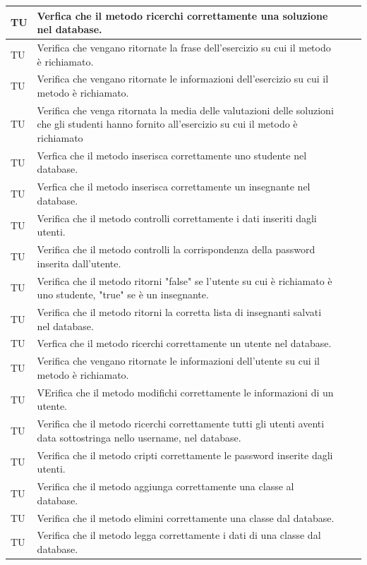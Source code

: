 \begin{longtable}{|>{\centering\arraybackslash}m{1.6cm}|>{\centering\arraybackslash}m{6.41cm}|>{\centering\arraybackslash}m{3.1cm}| c |}
		TU & Verfica che il metodo ricerchi correttamente una soluzione nel database.  \\ \hline
		TU & Verifica che vengano ritornate la frase dell'esercizio su cui il metodo è richiamato.  \\ \hline
		TU & Verifica che vengano ritornate le informazioni dell'esercizio su cui il metodo è richiamato.  \\ \hline
		TU & Verifica che venga ritornata la media delle valutazioni delle soluzioni che gli studenti hanno fornito all'esercizio su cui il metodo è richiamato  \\ \hline
		TU & Verfica che il metodo inserisca correttamente uno studente nel database.  \\ \hline
		TU & Verfica che il metodo inserisca correttamente un insegnante nel database.  \\ \hline
		TU & Verifica che il metodo controlli correttamente i dati inseriti dagli utenti.  \\ \hline
		TU & Verifica che il metodo controlli la corrispondenza della password inserita dall'utente.  \\ \hline
		TU & Verifica che il metodo ritorni "false" se l'utente su cui è richiamato è uno studente, "true" se è un insegnante.  \\ \hline
		TU & Verifica che il metodo ritorni la corretta lista di insegnanti salvati nel database.  \\ \hline
		TU & Verfica che il metodo ricerchi correttamente un utente nel database.  \\ \hline
		TU & Verifica che vengano ritornate le informazioni dell'utente su cui il metodo è richiamato.   \\ \hline
		TU & VErifica che il metodo modifichi correttamente le informazioni di un utente.  \\ \hline
		TU & Verifica che il metodo ricerchi correttamente tutti gli utenti aventi data sottostringa nello username, nel database.  \\ \hline
		TU & Verifica che il metodo cripti correttamente le password inserite dagli utenti.  \\ \hline
		TU & Verifica che il metodo aggiunga correttamente una classe al database. \\ \hline
		TU & Verifica che il metodo elimini correttamente una classe dal database. \\ \hline
		TU & Verifica che il metodo legga correttamente i dati di una classe dal database. \\ \hline

\end{longtable}
